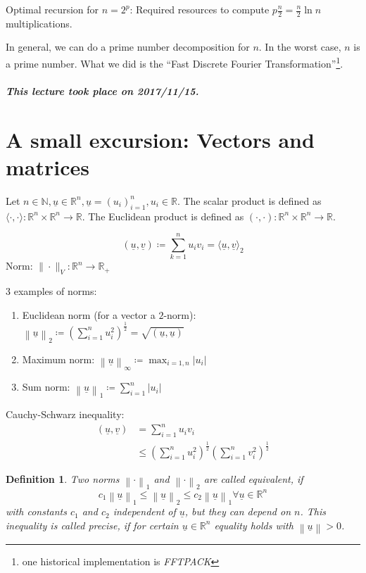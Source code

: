 \documentclass{article}
\newtheorem*{definition}{Definition}
\newcommand{\norm}[1]{\left\|#1\right\|}
\newcommand{\dateref}[1]{\paragraph{\textit{This lecture took place on #1.}}}
\begin{document}
Optimal recursion for $n=2^p$:
Required resources to compute $p \frac{n}{2} = \frac{n}{2} \ln{n}$ multiplications.

In general, we can do a prime number decomposition for $n$.
In the worst case, $n$ is a prime number.
What we did is the \enquote{Fast Discrete Fourier Transformation}\footnote{one historical implementation is \emph{FFTPACK}}.

\dateref{2017/11/15}

\section{A small excursion: Vectors and matrices}

Let $n \in \mathbb N, \underline{u} \in \mathbb R^n, \underline{u} = (u_i)^n_{i=1}, u_i \in \mathbb R$.
The scalar product is defined as $\langle \cdot, \cdot \rangle: \mathbb R^n \times \mathbb R^n \to \mathbb R$.
The Euclidean product is defined as $(\cdot, \cdot): \mathbb R^n \times \mathbb R^n \to \mathbb R$.

\[ (\underline{u}, \underline{v}) \coloneqq \sum_{k=1}^n u_i v_i = \langle \underline{u}, \underline{v}\rangle_2 \]
Norm: $\|\cdot\|_V: \mathbb R^n \to \mathbb R_+$

3 examples of norms:
\begin{enumerate}
  \item Euclidean norm (for a vector a $2$-norm): $\norm{\underline{u}}_2 \coloneqq \left(\sum_{i=1}^n u_i^2\right)^{\frac12} = \sqrt{(\underline{u}, \underline{u})}$
  \item Maximum norm: $\norm{\underline{u}}_{\infty} \coloneqq \max_{i=1,n} |u_i|$
  \item Sum norm: $\norm{\underline{u}}_1 \coloneqq \sum_{i=1}^n |u_i|$
\end{enumerate}

Cauchy-Schwarz inequality:
\begin{align*}
  (\underline{u}, \underline{v})
    &= \sum_{i=1}^n u_i v_i \\
    &\leq \left(\sum_{i=1}^n u_i^2\right)^{\frac12} \left(\sum_{i=1}^n v_i^2\right)^{\frac12}
\end{align*}

\begin{definition}
  Two norms $\norm{\cdot}_1$ and $\norm{\cdot}_2$ are called \emph{equivalent}, if
  \[ c_1 \norm{\underline{u}}_1 \leq \norm{\underline{u}}_2 \leq c_2 \norm{\underline{u}}_1 \forall \underline{u} \in \mathbb R^n \]
  with constants $c_1$ and $c_2$ independent of $\underline{u}$, but they can depend on $n$.
  This inequality is called \emph{precise}, if for certain $\underline{u} \in \mathbb R^n$ equality holds with $\norm{\underline{u}} > 0$.
\end{definition}
\end{document}
